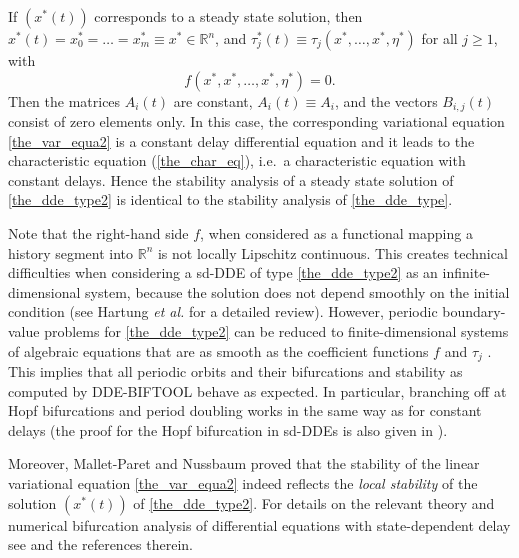 \documentclass[10pt]{scrartcl}
\newcommand{\DDEBIFCODE}{\textsc{DDE-BIFTOOL}}
\newcommand{\RR}{\mathbb{R}}
\begin{document}
If $(x^*(t))$ corresponds to a steady state
solution, then $x^*(t)=x^*_0=\ldots=x^*_m\equiv x^*\in\RR^n$, and
$\tau^*_j(t)\equiv \tau_j(x^*,\ldots,x^*,\eta^*)$ for all $j\geq1$, with
\[
f(x^*,x^*,\ldots,x^*,\eta^*)=0\mbox{.}
\]
Then the matrices $A_i(t)$ are constant, $A_i(t)\equiv A_i$, and the
vectors $B_{i,j}(t)$ consist of zero elements only.  In this case, the
corresponding variational equation \eqref{the_var_equa2} is a constant
delay differential equation and it leads to the characteristic
equation (\ref{the_char_eq}), i.e.~a characteristic equation with
constant delays. Hence the stability analysis of a steady state
solution of \eqref{the_dde_type2} is identical to the stability analysis
of \eqref{the_dde_type}.

Note that the right-hand side $f$, when considered as a functional
mapping a history segment into $\RR^n$ is not locally Lipschitz
continuous. This creates technical difficulties when considering a
sd-DDE of type \eqref{the_dde_type2} as an infinite-dimensional
system, because the solution does not depend smoothly on the
initial condition (see Hartung \emph{et al. }\cite{HKWW06} for a
detailed review). However, periodic boundary-value problems for
\eqref{the_dde_type2} can be reduced to finite-dimensional systems of
algebraic equations that are as smooth as the coefficient functions
$f$ and $\tau_j$ \cite{S12}. This implies that all periodic orbits and
their bifurcations and stability as computed by \DDEBIFCODE{} behave as
expected. In particular, branching off at Hopf bifurcations and period
doubling works in the same way as for constant delays (the proof for the Hopf
bifurcation in sd-DDEs is also given in \cite{S12}).


Moreover, Mallet-Paret and Nussbaum \cite{MN11} proved that the
stability of the linear variational equation \eqref{the_var_equa2}
indeed reflects the {\normalfont\itshape local stability} of the solution
$(x^*(t))$ of \cref{the_dde_type2}. 
For details on the relevant theory and numerical bifurcation analysis
of differential equations with state-dependent delay see
\cite{luz01,HKWW06,S17} and the references therein.
\end{document}
